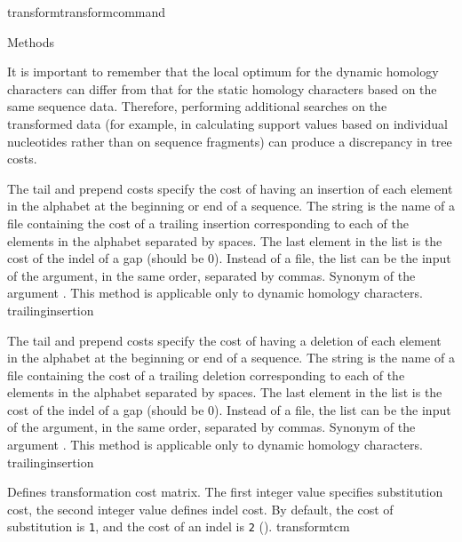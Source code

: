 \begin{command}{transform}{transformcommand}
\begin{arguments}
\begin{argumentgroup}{Methods}
	\begin{statement}
  	  It is important to remember that the local optimum for the dynamic homology
	  characters can differ from that for the static homology characters based on the
	  same sequence data. Therefore, performing additional searches on the transformed
	  data (for example, in calculating support values based on individual nucleotides
	  rather than on sequence fragments) can produce a discrepancy in tree costs.
	\end{statement}

            {The tail and prepend costs specify the cost of having an insertion of
            each element in the alphabet at the beginning or end
            of a sequence. The string is the name of a file containing the cost of
            a trailing insertion corresponding to each of the elements
            in the alphabet separated by spaces. The last element in the list is the
            cost of the indel of a gap (should be 0). Instead of a file, the list can
            be the input of the argument, in the same order, separated by commas.
            Synonym of the argument . This method is applicable only to dynamic homology characters.} 
            {trailinginsertion}

            {The tail and prepend costs specify the cost of having a deletion
            of each element in the alphabet at the beginning or end
            of a sequence. The string is the name of a file containing the cost of
            a trailing deletion corresponding to each of the elements
            in the alphabet separated by spaces. The last element in the list is the
            cost of the indel of a gap (should be 0). Instead of a file, the list can
            be the input of the argument, in the same order, separated by commas.
            Synonym of the argument . This method is applicable only to dynamic homology characters.} 
            {trailinginsertion}

            {Defines transformation cost matrix. The first integer value specifies
            substitution cost, the second integer value defines indel cost. By default,
            the cost of substitution is \texttt{1}, and the cost of an indel is \texttt{2}
            ().}
            {transformtcm}


\end{argumentgroup}
\end{arguments}
\end{command}
